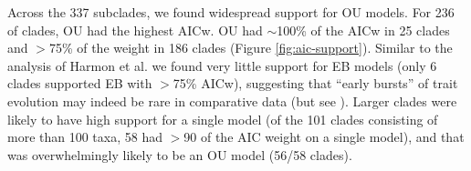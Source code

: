 \documentclass[a4paper,12pt]{article}
\begin{document}
Across the 337 subclades, we found widespread support for OU
models. For 236 of clades, OU had the highest AICw.
OU had $\sim$100\% of the AICw in 25 clades and $>$75\% of the weight in 186 clades (Figure \ref{fig:aic-support}). Similar to the analysis of Harmon et al. \citep{Harmon2010} we found very little support for EB models (only 6 clades supported EB with $>$75\% AICw), suggesting that ``early bursts'' of trait evolution may indeed be rare in comparative data (but see \citep{SlaterPennell}). Larger clades were
likely to have high support for a single model (of the 101 clades consisting of more than 100 taxa, 58 had $>$90 of the AIC weight on a single model),
and that was overwhelmingly likely to be an OU model (56/58 clades). 
%
\end{document}
